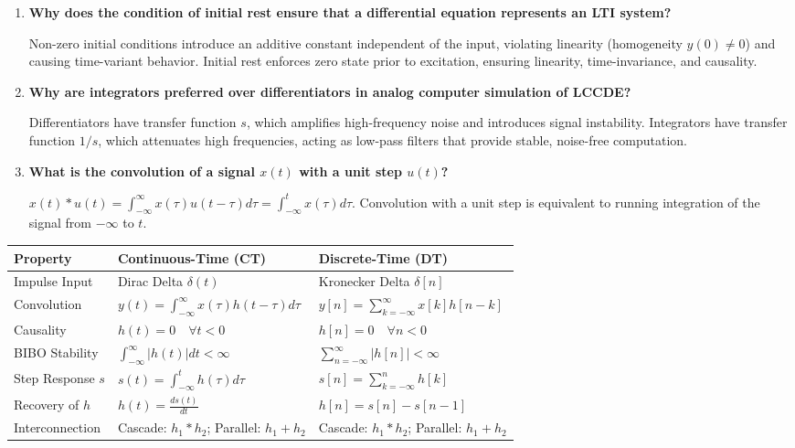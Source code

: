 \documentclass[12pt,a4paper]{article}
\newcommand{\Q}[1]{\textbf{#1}\par\noindent\ignorespaces}
\renewcommand{\arraystretch}{1.45}
\begin{document}
\begin{tcolorbox}[exambox, title={\textbf{Frequently Asked / Viva Questions}}]
\begin{enumerate}[topsep=0pt, label=\textbf{Q\arabic*.}, itemsep=5pt]
  \item \Q{Why does the condition of initial rest ensure that a differential equation represents an LTI system?}
  Non-zero initial conditions introduce an additive constant independent of the input, violating linearity (homogeneity $y(0) \ne 0$) and causing time-variant behavior. Initial rest enforces zero state prior to excitation, ensuring linearity, time-invariance, and causality.

  \item \Q{Why are integrators preferred over differentiators in analog computer simulation of LCCDE?}
  Differentiators have transfer function $s$, which amplifies high-frequency noise and introduces signal instability. Integrators have transfer function $1/s$, which attenuates high frequencies, acting as low-pass filters that provide stable, noise-free computation.

  \item \Q{What is the convolution of a signal $x(t)$ with a unit step $u(t)$?}
  $x(t) * u(t) = \int_{-\infty}^\infty x(\tau) u(t - \tau) d\tau = \int_{-\infty}^t x(\tau) d\tau$. Convolution with a unit step is equivalent to running integration of the signal from $-\infty$ to $t$.
\end{enumerate}
\end{tcolorbox}

\begin{tcolorbox}[tikzbox, title={\textbf{Summary Matrix: LSI Characterization Across Domains}}]
\par\vspace{4pt}\noindent
\begingroup
\setlength{\tabcolsep}{4.5pt}
\setlength{\extrarowheight}{3pt}
\renewcommand{\arraystretch}{1.35}
\begin{tabularx}{\linewidth}{|B{3.2cm}|B{4.5cm}|Y|}
\hline
\textbf{Property} & \textbf{Continuous-Time (CT)} & \textbf{Discrete-Time (DT)} \\
\hline
Impulse Input & Dirac Delta $\delta(t)$ & Kronecker Delta $\delta[n]$ \\
\hline
Convolution & $y(t) = \int_{-\infty}^\infty x(\tau) h(t-\tau) d\tau$ & $y[n] = \sum_{k=-\infty}^\infty x[k] h[n-k]$ \\
\hline
Causality & $h(t) = 0 \quad \forall t < 0$ & $h[n] = 0 \quad \forall n < 0$ \\
\hline
BIBO Stability & $\int_{-\infty}^\infty |h(t)| dt < \infty$ & $\sum_{n=-\infty}^\infty |h[n]| < \infty$ \\
\hline
Step Response $s$ & $s(t) = \int_{-\infty}^t h(\tau) d\tau$ & $s[n] = \sum_{k=-\infty}^n h[k]$ \\
\hline
Recovery of $h$ & $h(t) = \frac{ds(t)}{dt}$ & $h[n] = s[n] - s[n-1]$ \\
\hline
Interconnection & Cascade: $h_1 * h_2$; Parallel: $h_1 + h_2$ & Cascade: $h_1 * h_2$; Parallel: $h_1 + h_2$ \\
\hline
\end{tabularx}
\endgroup
\end{tcolorbox}
\end{document}
